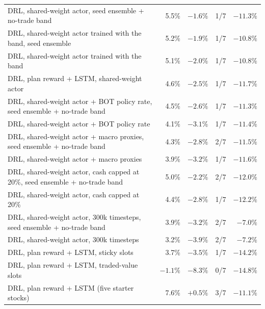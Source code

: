 \begin{table}[H]
\begin{tabularx}{\textwidth}{@{}Yrrrr@{}}
DRL, shared-weight actor, seed ensemble + no-trade band & 5.5\% & $-1.6\%$ & 1/7 & $-11.3\%$ \\
DRL, shared-weight actor trained with the band, seed ensemble & 5.2\% & $-1.9\%$ & 1/7 & $-10.8\%$ \\
DRL, shared-weight actor trained with the band & 5.1\% & $-2.0\%$ & 1/7 & $-10.8\%$ \\
DRL, plan reward + LSTM, shared-weight actor & 4.6\% & $-2.5\%$ & 1/7 & $-11.7\%$ \\
DRL, shared-weight actor + BOT policy rate, seed ensemble + no-trade band & 4.5\% & $-2.6\%$ & 1/7 & $-11.3\%$ \\
DRL, shared-weight actor + BOT policy rate & 4.1\% & $-3.1\%$ & 1/7 & $-11.4\%$ \\
DRL, shared-weight actor + macro proxies, seed ensemble + no-trade band & 4.3\% & $-2.8\%$ & 2/7 & $-11.5\%$ \\
DRL, shared-weight actor + macro proxies & 3.9\% & $-3.2\%$ & 1/7 & $-11.6\%$ \\
DRL, shared-weight actor, cash capped at 20\%, seed ensemble + no-trade band & 5.0\% & $-2.2\%$ & 2/7 & $-12.0\%$ \\
DRL, shared-weight actor, cash capped at 20\% & 4.4\% & $-2.8\%$ & 1/7 & $-12.2\%$ \\
DRL, shared-weight actor, 300k timesteps, seed ensemble + no-trade band & 3.9\% & $-3.2\%$ & 2/7 & $-7.0\%$ \\
DRL, shared-weight actor, 300k timesteps & 3.2\% & $-3.9\%$ & 2/7 & $-7.2\%$ \\
DRL, plan reward + LSTM, sticky slots & 3.7\% & $-3.5\%$ & 1/7 & $-14.2\%$ \\
DRL, plan reward + LSTM, traded-value slots & $-1.1\%$ & $-8.3\%$ & 0/7 & $-14.8\%$ \\
\midrule
DRL, plan reward + LSTM (five starter stocks) & 7.6\% & $+0.5\%$ & 3/7 & $-11.1\%$ \\
\bottomrule
\end{tabularx}
\end{table}


